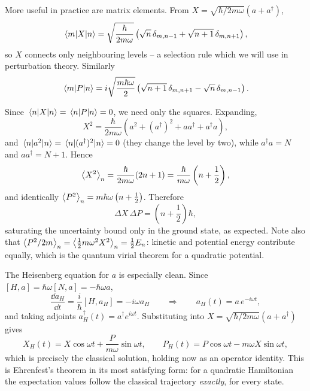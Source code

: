 \documentclass[a4paper]{scrartcl}
\begin{document}
More useful in practice are matrix elements. From $X = \sqrt{\hbar/2m\omega}(a + a^\dagger)$,
$$
\mel{m}{X}{n} = \sqrt{\frac{\hbar}{2m\omega}}\left( \sqrt{n}\,\delta_{m,n-1} + \sqrt{n+1}\,\delta_{m,n+1} \right),
$$
so $X$ connects only neighbouring levels -- a selection rule which we will use in perturbation theory. Similarly
$$
\mel{m}{P}{n} = i\sqrt{\frac{m\hbar\omega}{2}}\left( \sqrt{n+1}\,\delta_{m,n+1} - \sqrt{n}\,\delta_{m,n-1} \right).
$$

\begin{example}
    Since $\mel{n}{X}{n} = \mel{n}{P}{n} = 0$, we need only the squares. Expanding,
    $$
    X^2 = \frac{\hbar}{2m\omega}\left( a^2 + (a^\dagger)^2 + a a^\dagger + a^\dagger a \right),
    $$
    and $\mel{n}{a^2}{n} = \mel{n}{(a^\dagger)^2}{n} = 0$ (they change the level by two), while $a^\dagger a = N$ and $aa^\dagger = N+1$. Hence
    $$
    \expval{X^2}_n = \frac{\hbar}{2m\omega}(2n+1) = \frac{\hbar}{m\omega}\left(n + \frac{1}{2}\right),
    $$
    and identically $\expval{P^2}_n = m\hbar\omega\left(n + \frac12\right)$. Therefore
    $$
    \Delta X \, \Delta P = \left(n + \frac{1}{2}\right)\hbar,
    $$
    saturating the uncertainty bound only in the ground state, as expected. Note also that $\expval{P^2/2m}_n = \expval{\frac12 m\omega^2X^2}_n = \frac12 E_n$: kinetic and potential energy contribute equally, which is the quantum virial theorem for a quadratic potential.
\end{example}

\begin{example}
    The Heisenberg equation for $a$ is especially clean. Since $[H, a] = \hbar\omega[N,a] = -\hbar\omega a$,
    $$
    \frac{\dd a_H}{\dd t} = \frac{i}{\hbar}[H, a_H] = -i\omega a_H \qquad \Longrightarrow \qquad a_H(t) = a \, e^{-i\omega t},
    $$
    and taking adjoints $a_H^\dagger(t) = a^\dagger e^{i\omega t}$. Substituting into $X = \sqrt{\hbar/2m\omega}(a + a^\dagger)$ gives
    $$
    X_H(t) = X\cos\omega t + \frac{P}{m\omega}\sin\omega t, \qquad P_H(t) = P \cos\omega t - m\omega X \sin\omega t,
    $$
    which is precisely the classical solution, holding now as an operator identity. This is Ehrenfest's theorem in its most satisfying form: for a quadratic Hamiltonian the expectation values follow the classical trajectory \emph{exactly}, for every state.
\end{example}
\end{document}
